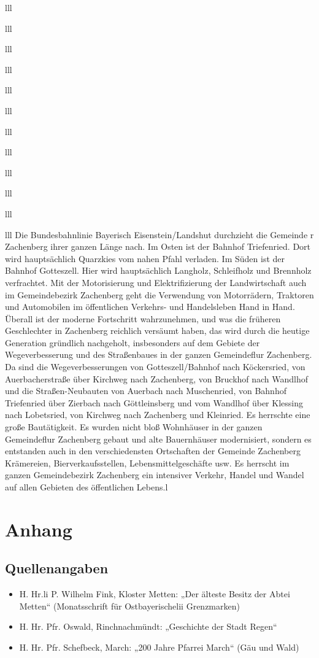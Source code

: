 \documentclass[12pt,a4pager]{book}
\begin{document}
\begin{tabuluar}{lll}
\begin{tabuluar}{lll}
\begin{tabuluar}{lll}
\begin{tabuluar}{lll}
\begin{tabuluar}{lll}
\begin{tabuluar}{lll}
\begin{tabuluar}{lll}
\begin{tabuluar}{lll}
\begin{tabuluar}{lll}
\begin{tabuluar}{lll}
\begin{tabuluar}{lll}
\begin{tabuluar}{lll}
Die Bundesbahnlinie Bayerisch Eisenstein/Landshut durchzieht die Gemeinde r
Zachenberg ihrer ganzen Länge nach. Im Osten ist der Bahnhof Triefenried. Dort
wird hauptsächlich Quarzkies vom nahen Pfahl verladen. Im Süden ist der Bahnhof
Gotteszell. Hier wird hauptsächlich Langholz, Schleifholz und Brennholz
verfrachtet. Mit der Motorisierung und Elektrifizierung der Landwirtschaft auch
im Gemeindebezirk Zachenberg geht die Verwendung von Motorrädern, Traktoren und
Automobilen im öffentlichen Verkehrs- und Handelsleben Hand in Hand. Überall ist
der moderne Fortschritt wahrzunehmen, und was die früheren Geschlechter in
Zachenberg reichlich versäumt haben, das wird durch die heutige Generation
gründlich nachgeholt, insbesonders auf dem Gebiete der Wegeverbesserung und des
Straßenbaues in der ganzen Gemeindeflur Zachenberg. Da sind die
Wegeverbesserungen von Gotteszell/Bahnhof nach Köckersried, von Auerbacherstraße
über Kirchweg nach Zachenberg, von Bruckhof nach Wandlhof und die
Straßen-Neubauten von Auerbach nach Muschenried, von Bahnhof Triefenried über
Zierbach nach Göttleinsberg und vom Wandlhof über Klessing nach Lobetsried, von
Kirchweg nach Zachenberg und Kleinried. Es herrschte eine große Bautätigkeit. Es
wurden nicht bloß Wohnhäuser in der ganzen Gemeindeflur Zachenberg gebaut und
alte Bauernhäuser modernisiert, sondern es entstanden auch in den
verschiedensten Ortschaften der Gemeinde Zachenberg Krämereien,
Bierverkaufsstellen, Lebensmittelgeschäfte usw. Es herrscht im ganzen
Gemeindebezirk Zachenberg ein intensiver Verkehr, Handel und Wandel auf allen
Gebieten des öffentlichen Lebens.l

\part{Anhang}

\chapter{Quellenangaben}

\begin{itemize}
\item H. Hr.li P. Wilhelm Fink, Kloster Metten: „Der älteste Besitz der Abtei
Metten“ (Monatsschrift für Ostbayerischelii Grenzmarken)

\item H. Hr. Pfr. Oswald, Rinchnachmündt: „Geschichte der Stadt Regen“

\item H. Hr. Pfr. Schefbeck, March: „200 Jahre Pfarrei March“ (Gäu und Wald)


\end{itemize}
\end{tabuluar}
\end{tabuluar}
\end{tabuluar}
\end{tabuluar}
\end{tabuluar}
\end{tabuluar}
\end{tabuluar}
\end{tabuluar}
\end{tabuluar}
\end{tabuluar}
\end{tabuluar}
\end{tabuluar}
\end{document}

